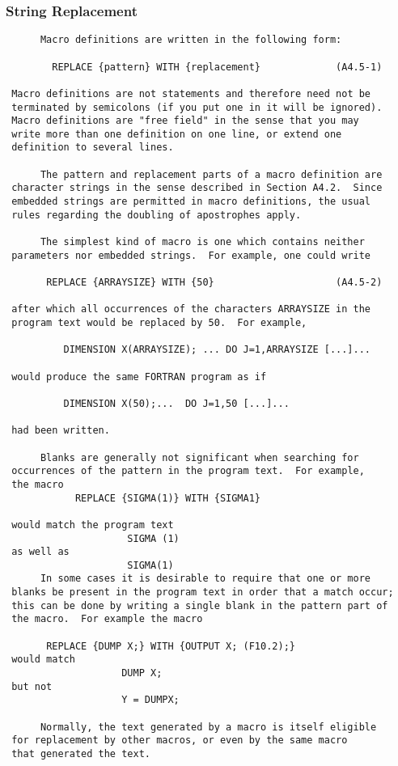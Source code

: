  \subsubsection{String Replacement}
 \begin{verbatim}
      Macro definitions are written in the following form:

        REPLACE {pattern} WITH {replacement}             (A4.5-1)

 Macro definitions are not statements and therefore need not be
 terminated by semicolons (if you put one in it will be ignored).
 Macro definitions are "free field" in the sense that you may
 write more than one definition on one line, or extend one
 definition to several lines.

      The pattern and replacement parts of a macro definition are
 character strings in the sense described in Section A4.2.  Since
 embedded strings are permitted in macro definitions, the usual
 rules regarding the doubling of apostrophes apply.

      The simplest kind of macro is one which contains neither
 parameters nor embedded strings.  For example, one could write

       REPLACE {ARRAYSIZE} WITH {50}                     (A4.5-2)

 after which all occurrences of the characters ARRAYSIZE in the
 program text would be replaced by 50.  For example,

          DIMENSION X(ARRAYSIZE); ... DO J=1,ARRAYSIZE [...]...

 would produce the same FORTRAN program as if

          DIMENSION X(50);...  DO J=1,50 [...]...

 had been written.

      Blanks are generally not significant when searching for
 occurrences of the pattern in the program text.  For example,
 the macro
            REPLACE {SIGMA(1)} WITH {SIGMA1}

 would match the program text
                     SIGMA (1)
 as well as
                     SIGMA(1)
      In some cases it is desirable to require that one or more
 blanks be present in the program text in order that a match occur;
 this can be done by writing a single blank in the pattern part of
 the macro.  For example the macro

       REPLACE {DUMP X;} WITH {OUTPUT X; (F10.2);}
 would match
                    DUMP X;
 but not
                    Y = DUMPX;

      Normally, the text generated by a macro is itself eligible
 for replacement by other macros, or even by the same macro
 that generated the text.

 \end{verbatim}
